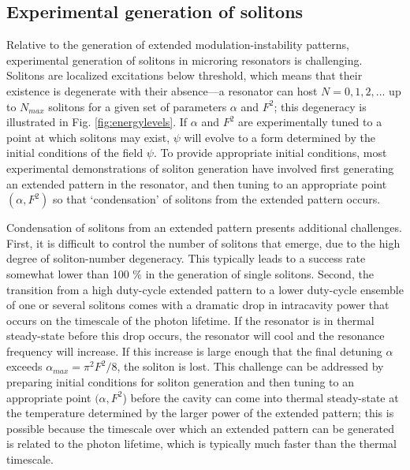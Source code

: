 {\subsection{Experimental generation of solitons}


Relative to the generation of extended modulation-instability patterns, experimental generation of solitons in microring resonators is challenging. Solitons are localized excitations below threshold, which means that their existence is degenerate with their absence---a resonator can host $N=0, 1, 2,...$ up to $N_{max}$ solitons for a given set of parameters $\alpha$ and $F^2$; this degeneracy is illustrated in Fig. \ref{fig:energylevels}. If $\alpha$ and $F^2$ are experimentally tuned to a point at which solitons may exist, $\psi$ will evolve to a form determined by the initial conditions of the field $\psi$. To provide appropriate initial conditions, most experimental demonstrations of soliton generation have involved first generating an extended pattern in the resonator, and then tuning to an appropriate point $(\alpha,F^2)$ so that `condensation' of solitons from the extended pattern occurs. 

Condensation of solitons from an extended pattern presents additional challenges. First, it is difficult to control the number of solitons that emerge, due to the high degree of soliton-number degeneracy. This typically leads to a success rate somewhat lower than 100 $\%$ in the generation of single solitons. Second, the transition from a high duty-cycle extended pattern to a lower duty-cycle ensemble of one or several solitons comes with a dramatic drop in intracavity power that occurs on the timescale of the photon lifetime. If the resonator is in thermal steady-state before this drop occurs, the resonator will cool and the resonance frequency will increase. If this increase is large enough that the final detuning $\alpha$ exceeds $\alpha_{max}=\pi^2 F^2/8$, the soliton is lost. This challenge can be addressed by preparing initial conditions for soliton generation and then tuning to an appropriate point $(\alpha,F^2$) before the cavity can come into thermal steady-state at the temperature determined by the larger power of the extended pattern; this is possible because the timescale over which an extended pattern can be generated is related to the photon lifetime, which is typically much faster than the thermal timescale.

}
